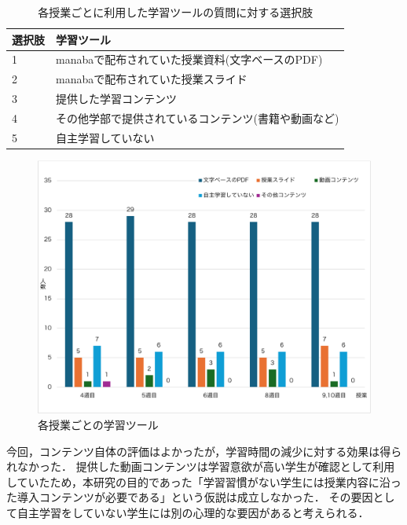 \documentclass[12pt,a4j,titlepage]{ltjsarticle}
\begin{document}
\begin{table}[htbp]
  \caption{各授業ごとに利用した学習ツールの質問に対する選択肢}
  \begin{center}
\begin{tabular}{ll}\hline
選択肢 & 学習ツール\\ \hline
               1 & manabaで配布されていた授業資料(文字ベースのPDF)\\
               2 & manabaで配布されていた授業スライド\\
               3 & 提供した学習コンテンツ\\
               4 & その他学部で提供されているコンテンツ(書籍や動画など)\\
               5 & 自主学習していない\\
              \hline
               \end{tabular}
               \end{center}
               \label{tb:anke2_4}
               \end{table}

\begin{figure}[!htb]
  \centering
  \includegraphics[width=15cm]{各授業ごとの学習ツール.pdf}
  \caption{各授業ごとの学習ツール}
  \label{fig:tu-ru}
\end{figure}


今回，コンテンツ自体の評価はよかったが，学習時間の減少に対する効果は得られなかった．
提供した動画コンテンツは学習意欲が高い学生が確認として利用していたため，本研究の目的であった「学習習慣がない学生には授業内容に沿った導入コンテンツが必要である」という仮説は成立しなかった．
その要因として自主学習をしていない学生には別の心理的な要因があると考えられる．
\end{document}
